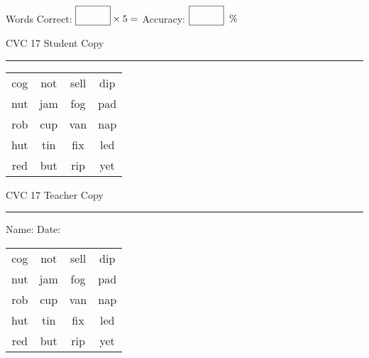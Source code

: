 \documentclass{memoir}
\begin{document}
\small

Words Correct: $\fbox{\phantom{\huge 100}} \times 5 = $ Accuracy: $\fbox{\phantom{\huge 100}}\;\; \%$ 

\vfill

\newpage


\footnotesize \noindent
CVC 17 \hfill Student Copy
\smallskip
\hrule

\Large

\setlength{\tabcolsep}{14pt}
\def\arraystretch{2}

{\selectfont


\begin{vplace}[0.5]
\begin{center}
\begin{tabular}{cccc}
cog & not & sell & dip \\
nut & jam & fog & pad \\
rob & cup & van & nap \\
hut & tin & fix & led \\
red & but & rip & yet \\
\end{tabular}
\end{center}
\end{vplace}

}

\newpage

\footnotesize \noindent
CVC 17 \hfill Teacher Copy
\smallskip
\hrule

\small

\vfill

\noindent
Name: \underline{\hspace{1.75in}} \hfill Date: \underline{\hspace{1in}}

\Large

{\selectfont


\begin{vplace}[0.5]
\begin{center}
\begin{tabular}{cccc}
cog & not & sell & dip \\
nut & jam & fog & pad \\
rob & cup & van & nap \\
hut & tin & fix & led \\
red & but & rip & yet \\
\end{tabular}
\end{center}
\end{vplace}



}
\end{document}
